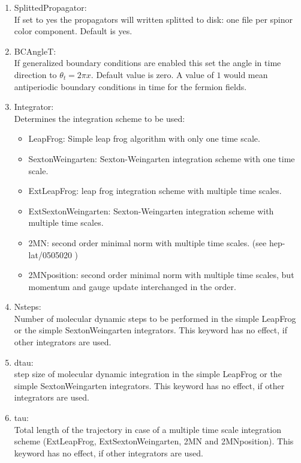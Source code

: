 \begin{enumerate}
\item {\ttfamily SplittedPropagator}:\\
  If set to yes the propagators will written splitted to disk: one
  file per spinor color component. Default is {\ttfamily yes}.

\item {\ttfamily BCAngleT}:\\
  If generalized boundary conditions are enabled this set the angle in
  time direction to $\theta_t = 2\pi x$. Default value is
  zero. A value of $1$ would mean antiperiodic boundary conditions in
  time for the fermion fields.

\item {\ttfamily Integrator}:\\
  Determines the integration scheme to be used:
  \begin{itemize}
  \item {\ttfamily LeapFrog}: Simple leap frog algorithm with only one
    time scale. 
  \item {\ttfamily SextonWeingarten}: Sexton-Weingarten integration
    scheme with one time scale.
  \item {\ttfamily ExtLeapFrog}: leap frog integration scheme with
    multiple time scales.
  \item {\ttfamily ExtSextonWeingarten}: Sexton-Weingarten integration scheme with
    multiple time scales.
  \item {\ttfamily 2MN}: second order minimal norm with multiple time
    scales. (see {\ttfamily hep-lat/0505020} )
  \item {\ttfamily 2MNposition}: second order minimal norm with
    multiple time scales, but momentum and gauge update interchanged
    in the order.
  \end{itemize}

\item {\ttfamily Nsteps}:\\
  Number of molecular dynamic steps to be performed in the simple
  {\ttfamily LeapFrog} or the simple {\ttfamily SextonWeingarten}
  integrators. This keyword has no effect, if other integrators are
  used.

\item {\ttfamily dtau}:\\
  step size of molecular dynamic integration in the simple
  {\ttfamily LeapFrog} or the simple {\ttfamily SextonWeingarten}
  integrators. This keyword has no effect, if other integrators are
  used.

\item {\ttfamily tau}:\\
  Total length of the trajectory in case of a multiple time scale
  integration scheme ({\ttfamily ExtLeapFrog}, {\ttfamily
    ExtSextonWeingarten}, {\ttfamily 2MN} and {\ttfamily
    2MNposition}). This keyword has no effect, if other integrators
  are used.


\end{enumerate}
